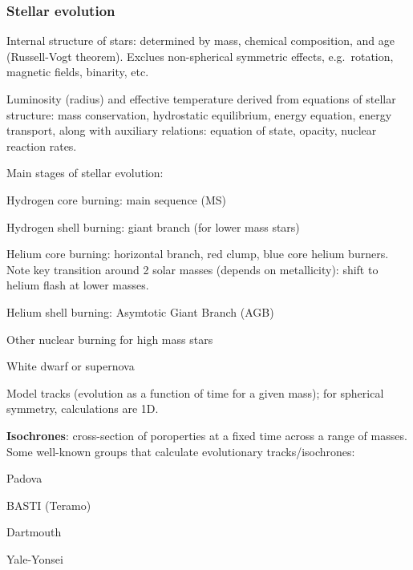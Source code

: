 \documentclass[12pt]{article}
\begin{document}
\subsubsection*{Stellar evolution}
\begin{itemize*} %
    \item Internal structure of stars: determined by mass, chemical
        composition, and age (Russell-Vogt theorem). Exclues
        non-spherical symmetric effects, e.g.\ rotation, magnetic
        fields, binarity, etc.
    \item Luminosity (radius) and effective temperature derived from
        equations of stellar structure: mass conservation, hydrostatic
        equilibrium, energy equation, energy transport, along
        with auxiliary relations: equation of state, opacity, nuclear
        reaction rates.
    \item Main stages of stellar evolution:
        \begin{itemize*} %
            \item Hydrogen core burning: main sequence (MS)
            \item Hydrogen shell burning: giant branch (for lower mass
                stars)
            \item Helium core burning: horizontal branch, red clump,
                blue core helium burners. Note key transition around 2
                solar masses (depends on metallicity): shift to helium
                flash at lower masses.
            \item Helium shell burning: Asymtotic Giant Branch (AGB)
            \item Other nuclear burning for high mass stars
            \item White dwarf or supernova
        \end{itemize*} %
    \item Model tracks (evolution as a function of time for a given
      mass); for spherical symmetry, calculations are 1D.
    \item \textbf{Isochrones}: cross-section of poroperties at a
      fixed time across a range of masses. Some well-known groups that
      calculate evolutionary tracks/isochrones:
      \begin{itemize*}
          \item Padova
          \item BASTI (Teramo)
          \item Dartmouth
          \item Yale-Yonsei

\end{itemize*}
\end{itemize*}
\end{document}
